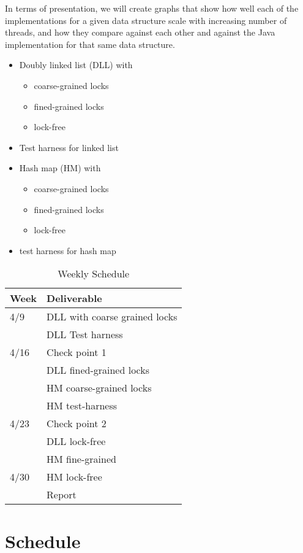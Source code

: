\documentclass[11pt]{article}
\begin{document}
In terms of presentation, we will create graphs that show how well each of the
implementations for a given data structure scale with increasing number of
threads, and how they compare against each other and against the Java
implementation for that same data structure.

\begin{itemize}
\item Doubly linked list (DLL) with
\begin{itemize}
\item coarse-grained locks
\item fined-grained locks
\item lock-free
\end{itemize}
\item Test harness for linked list
\item Hash map (HM) with
\begin{itemize}
\item coarse-grained locks
\item fined-grained locks
\item lock-free
\end{itemize}
\item test harness for hash map
\end{itemize}

\begin{table}[t]
\begin{center}
\begin{tabular}{ll}
\toprule
\bf Week & \bf Deliverable   \\
\midrule
4/9      & DLL with coarse grained locks \\
         & DLL Test harness \\
4/16     & Check point 1 \\
         & DLL fined-grained locks \\
         & HM coarse-grained locks \\
         & HM test-harness \\
4/23     & Check point 2 \\
         & DLL lock-free \\
         & HM fine-grained \\
4/30     & HM lock-free \\
         & Report \\
\bottomrule
\end{tabular}
\caption{Weekly Schedule}
\label{table:shedule}
\end{center}
\end{table}

\section*{Schedule}

\printbibliography
\end{document}
